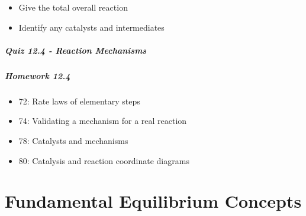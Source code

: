\documentclass[12pt, openany, letterpaper]{memoir}
\begin{document}
\begin{itemize}
	
	
	\begin{itemize}
		\item Give the total overall reaction
		\item Identify any catalysts and intermediates
	\end{itemize}
\end{itemize}

\paragraph*{Quiz 12.4 - Reaction Mechanisms}
\paragraph*{Homework 12.4}
\begin{itemize}
  \item 72: Rate laws of elementary steps
  \item 74: Validating a mechanism for a real reaction
  \item 78: Catalysts and mechanisms
  \item 80: Catalysis and reaction coordinate diagrams
\end{itemize}

\chapter{Fundamental Equilibrium Concepts}
\end{document}
